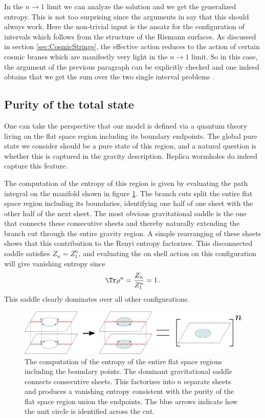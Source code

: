  
 In the $n\to 1$ limit we can analyze the solution and we get the generalized entropy. This is not too surprising since the arguments in \cite{Dong:2017xht} say that this should always work. Here the non-trivial input is the ansatz for the configuration of intervals which follows from the structure of the Riemann surfaces. As discussed in section \ref{sec:CosmicStrings}, the effective action reduces to the action of certain cosmic  branes which are manifestly very light in the $n\to 1$ limit. So in this case, the argument of the previous paragraph can be explicitly checked and one indeed obtains that we get the sum over the two single interval problems \cite{Almheiri:2019yqk}. 
  

\subsection{Purity of the total state}


One can take the perspective that our model is defined via a quantum theory living on the flat space region including its boundary endpoints. The global pure state we consider should be a pure state of this region, and a natural question is whether this is captured in the gravity description. Replica wormholes do indeed capture this feature.

The computation of the entropy of this region is given by evaluating the path integral on the manifold shown in figure \ref{FullIntervalSheets}. The branch cuts split the entire flat space region including its boundaries, identifying one half of one sheet with the other half of the next sheet. The most obvious gravitational saddle is the one that connects these consecutive sheets and thereby naturally extending the branch cut through the entire gravity region. A simple rearranging of these sheets shows that this contribution to the Renyi entropy factorizes. This disconnected saddle satisfies $Z_n = Z_1^n$, and evaluating the on shell action on this configuration will give vanishing entropy since
\begin{align}
\Tr \rho^n = {Z_n \over Z_1^n} = 1\,.
\end{align}
This saddle clearly dominates over all other configurations. 

\begin{figure}
\begin{center}
\includegraphics[scale=0.3]{figures/FullIntervalSheets.jpg}
\end{center}
\caption{\small The computation of the entropy of the entire flat space regions including the boundary points. The dominant gravitational saddle connects consecutive sheets. This factorizes into $n$ separate sheets and produces a vanishing entropy consistent with the purity of the flat space region union the endpoints. The blue arrows indicate how the unit circle is identified across the cut.
\label{FullIntervalSheets}}
\end{figure}

